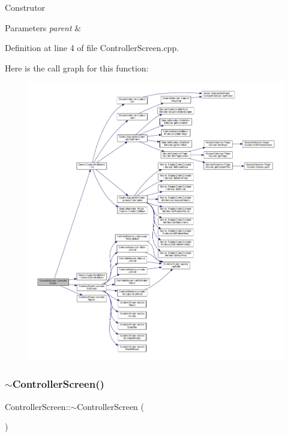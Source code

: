 Construtor 
\begin{DoxyParams}{Parameters}
{\em parent} & \\
\hline
\end{DoxyParams}


Definition at line 4 of file Controller\+Screen.\+cpp.

Here is the call graph for this function\+:
\nopagebreak
\begin{figure}[H]
\begin{center}
\leavevmode
\includegraphics[width=350pt]{class_controller_screen_aecef7737326dbb37945e6a9eac6dcede_cgraph}
\end{center}
\end{figure}
\mbox{\label{class_controller_screen_a4871b73dbeec4679ba6bee692bfe71a9}} 
\subsubsection{\texorpdfstring{$\sim$\+Controller\+Screen()}{~ControllerScreen()}}
{\footnotesize\ttfamily Controller\+Screen\+::$\sim$\+Controller\+Screen (\begin{DoxyParamCaption}{ }\end{DoxyParamCaption})}

